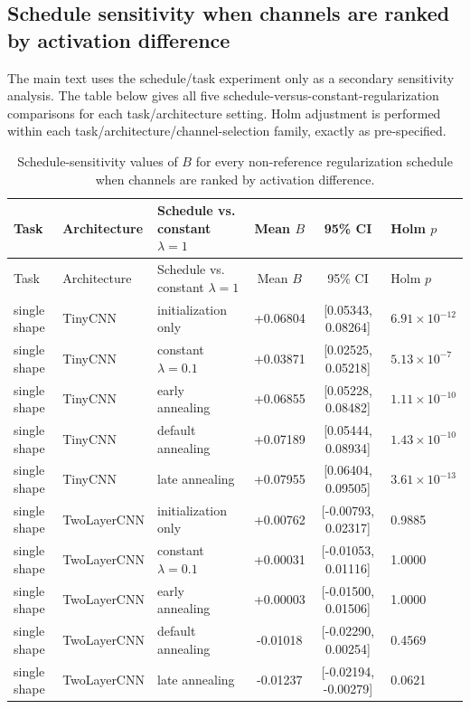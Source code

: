 \subsection{Schedule sensitivity when channels are ranked by activation difference}\label{app:schedule-profiles}

The main text uses the schedule/task experiment only as a secondary sensitivity analysis. The table below gives all five schedule-versus-constant-regularization comparisons for each task/architecture setting. Holm adjustment is performed within each task/architecture/channel-selection family, exactly as pre-specified.

{
\small
\setlength{\tabcolsep}{3.5pt}
\begin{longtable}{lllccl}
\caption{Schedule-sensitivity values of $B$ for every non-reference regularization schedule when channels are ranked by activation difference.}\label{tab:schedule-profiles}\\
\toprule
Task & Architecture & Schedule vs. constant $\lambda=1$ & Mean $B$ & 95\% CI & Holm $p$ \\
\midrule
\endfirsthead
\toprule
Task & Architecture & Schedule vs. constant $\lambda=1$ & Mean $B$ & 95\% CI & Holm $p$ \\
\midrule
\endhead
\bottomrule
\endfoot
single shape & TinyCNN & initialization only & +0.06804 & [0.05343, 0.08264] & $6.91\times10^{-12}$ \\
single shape & TinyCNN & constant $\lambda=0.1$ & +0.03871 & [0.02525, 0.05218] & $5.13\times10^{-7}$ \\
single shape & TinyCNN & early annealing & +0.06855 & [0.05228, 0.08482] & $1.11\times10^{-10}$ \\
single shape & TinyCNN & default annealing & +0.07189 & [0.05444, 0.08934] & $1.43\times10^{-10}$ \\
single shape & TinyCNN & late annealing & +0.07955 & [0.06404, 0.09505] & $3.61\times10^{-13}$ \\
single shape & TwoLayerCNN & initialization only & +0.00762 & [-0.00793, 0.02317] & 0.9885 \\
single shape & TwoLayerCNN & constant $\lambda=0.1$ & +0.00031 & [-0.01053, 0.01116] & 1.0000 \\
single shape & TwoLayerCNN & early annealing & +0.00003 & [-0.01500, 0.01506] & 1.0000 \\
single shape & TwoLayerCNN & default annealing & -0.01018 & [-0.02290, 0.00254] & 0.4569 \\
single shape & TwoLayerCNN & late annealing & -0.01237 & [-0.02194, -0.00279] & 0.0621 \\

\end{longtable}}
